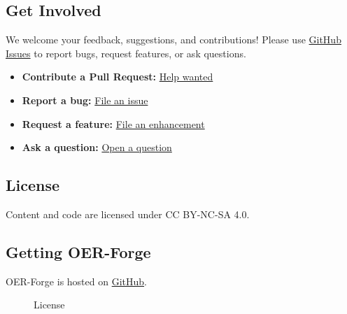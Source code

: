 \subsection{Get Involved}\label{get-involved}

We welcome your feedback, suggestions, and contributions! Please use
\href{https://github.com/OER-Forge/OER-Forge/issues}{GitHub Issues} to
report bugs, request features, or ask questions.

\begin{itemize}
\tightlist
\item
  \textbf{Contribute a Pull Request:}
  \href{https://github.com/OER-Forge/OER-Forge/labels/help\%20wanted}{Help
  wanted}
\item
  \textbf{Report a bug:}
  \href{https://github.com/OER-Forge/OER-Forge/issues/new?labels=bug}{File
  an issue}
\item
  \textbf{Request a feature:}
  \href{https://github.com/OER-Forge/OER-Forge/issues/new?labels=enhancement}{File
  an enhancement}
\item
  \textbf{Ask a question:}
  \href{https://github.com/OER-Forge/OER-Forge/issues/new?labels=question}{Open
  a question}
\end{itemize}

\subsection{License}\label{license}

Content and code are licensed under CC BY-NC-SA 4.0.

\subsection{Getting OER-Forge}\label{getting-oer-forge}

OER-Forge is hosted on
\href{https://github.com/OER-Forge/OER-Forge}{GitHub}.



\begin{figure}
\centering
\pandocbounded{}
\caption{License}
\end{figure}

